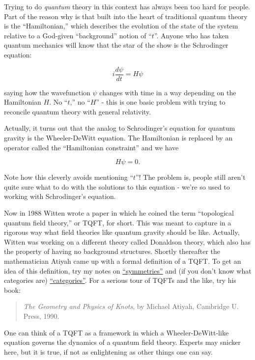 \documentclass{article}
\begin{document}
Trying to do \emph{quantum} theory in this context has always been too
hard for people. Part of the reason why is that built into the heart of
traditional quantum theory is the ``Hamiltonian,'' which describes the
evolution of the state of the system relative to a God-given
``background'' notion of ``\(t\)''. Anyone who has taken quantum
mechanics will know that the star of the show is the Schrodinger
equation:

\[i\frac{d\psi}{dt} = H\psi\]

saying how the wavefunction \(\psi\) changes with time in a way
depending on the Hamiltonian \(H\). No ``\(t\),'' no ``\(H\)'' - this is
one basic problem with trying to reconcile quantum theory with general
relativity.

Actually, it turns out that the analog to Schrodinger's equation for
quantum gravity is the Wheeler-DeWitt equation. The Hamiltonian is
replaced by an operator called the ``Hamiltonian constraint'' and we
have

\[H\psi = 0.\]

Note how this cleverly avoids mentioning ``\(t\)''! The problem is,
people still aren't quite sure what to do with the solutions to this
equation - we're so used to working with Schrodinger's equation.

Now in 1988 Witten wrote a paper in which he coined the term
``topological quantum field theory,'' or TQFT, for short. This was meant
to capture in a rigorous way what field theories like quantum gravity
should be like. Actually, Witten was working on a different theory
called Donaldson theory, which also has the property of having no
background structures. Shortly thereafter the mathematician Atiyah came
up with a formal definition of a TQFT. To get an idea of this
definition, try my notes on
\href{http://math.ucr.edu/home/baez/symmetries.html}{``symmetries''} and
(if you don't know what categories are)
\href{http://math.ucr.edu/home/baez/categories.html}{``categories''}.
For a serious tour of TQFTs and the like, try his book:

\begin{quote}
\emph{The Geometry and Physics of Knots}, by Michael Atiyah, Cambridge
U. Press, 1990.
\end{quote}

One can think of a TQFT as a framework in which a Wheeler-DeWitt-like
equation governs the dynamics of a quantum field theory. Experts may
snicker here, but it is true, if not as enlightening as other things one
can say.
\end{document}
